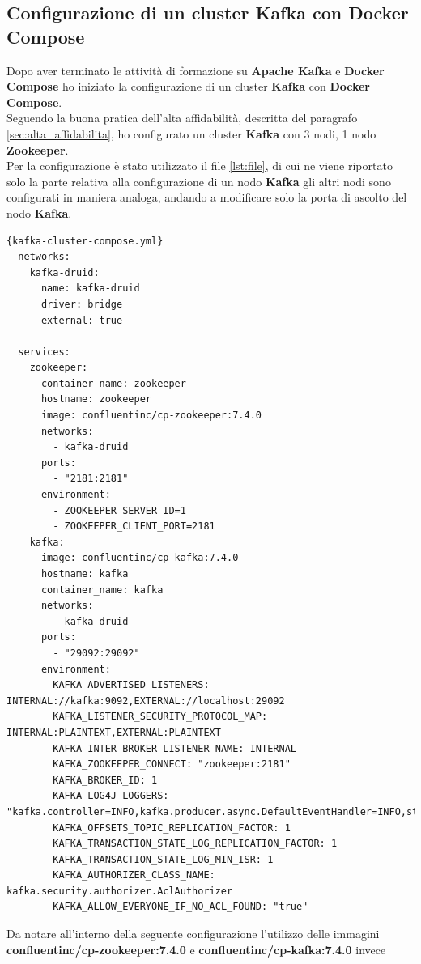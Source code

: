 \subsection{Configurazione di un cluster Kafka con Docker Compose}
Dopo aver terminato le attività di formazione su \textbf{Apache Kafka} e \textbf{Docker Compose} 
ho iniziato la configurazione di un \gls{cluster}{} \textbf{Kafka} con \textbf{Docker Compose}. 
\\Seguendo la buona pratica dell'alta affidabilità, descritta del 
paragrafo \ref{sec:alta_affidabilita}, ho configurato un \gls{cluster}{} \textbf{Kafka} con 3 nodi, 1 nodo \textbf{Zookeeper}.\\
Per la configurazione è stato utilizzato il file \ref{lst:file}, di cui ne viene riportato solo la parte relativa alla configurazione di un nodo \textbf{Kafka} gli altri nodi sono configurati in maniera analoga, andando a modificare
solo la porta di ascolto del nodo \textbf{Kafka}.
\pagebreak
\begin{lstlisting}[caption=\texttt{kafka-cluster-compose.yml}, label=lst:file]{kafka-cluster-compose.yml}
  networks:
    kafka-druid:
      name: kafka-druid
      driver: bridge
      external: true
  
  services:
    zookeeper:
      container_name: zookeeper
      hostname: zookeeper
      image: confluentinc/cp-zookeeper:7.4.0
      networks: 
        - kafka-druid
      ports:
        - "2181:2181"
      environment:
        - ZOOKEEPER_SERVER_ID=1
        - ZOOKEEPER_CLIENT_PORT=2181
    kafka:
      image: confluentinc/cp-kafka:7.4.0
      hostname: kafka
      container_name: kafka
      networks:
        - kafka-druid
      ports:
        - "29092:29092"
      environment:
        KAFKA_ADVERTISED_LISTENERS: INTERNAL://kafka:9092,EXTERNAL://localhost:29092
        KAFKA_LISTENER_SECURITY_PROTOCOL_MAP: INTERNAL:PLAINTEXT,EXTERNAL:PLAINTEXT
        KAFKA_INTER_BROKER_LISTENER_NAME: INTERNAL
        KAFKA_ZOOKEEPER_CONNECT: "zookeeper:2181"
        KAFKA_BROKER_ID: 1
        KAFKA_LOG4J_LOGGERS: "kafka.controller=INFO,kafka.producer.async.DefaultEventHandler=INFO,state.change.logger=INFO"
        KAFKA_OFFSETS_TOPIC_REPLICATION_FACTOR: 1
        KAFKA_TRANSACTION_STATE_LOG_REPLICATION_FACTOR: 1
        KAFKA_TRANSACTION_STATE_LOG_MIN_ISR: 1
        KAFKA_AUTHORIZER_CLASS_NAME: kafka.security.authorizer.AclAuthorizer
        KAFKA_ALLOW_EVERYONE_IF_NO_ACL_FOUND: "true"  
\end{lstlisting}   
Da notare all'interno della seguente configurazione l'utilizzo delle immagini\\ \textbf{confluentinc/cp-zookeeper:7.4.0} e \textbf{confluentinc/cp-kafka:7.4.0} invece 
